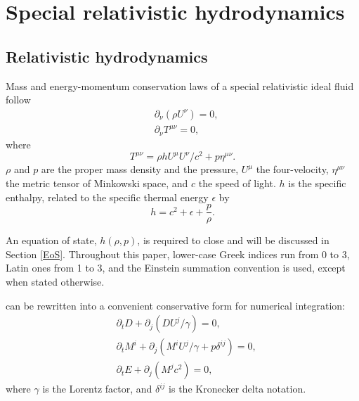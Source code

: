 \chapter{Special relativistic hydrodynamics}
\label{c:special-relativistic-hydrodynamics}
\section{Relativistic hydrodynamics}
\label{Relativistic Hydrodynamics}
Mass and energy-momentum conservation laws of a special relativistic ideal fluid follow
\begin{subequations}
\label{eq:conservation laws}
\begin{align}
&\partial_{\nu}\left(\rho U^{\nu}\right)=0, \label{eq:number conservation}\\
&\partial_{\nu}T^{\mu \nu} = 0, \label{eq:energy conservation}
\end{align}
\end{subequations}
where
\begin{equation}
T^{\mu \nu} = \rho h U^{\mu} U^{\nu}/c^2 + p \eta^{\mu \nu}.
\end{equation}
$\rho$ and $p$ are the proper mass density and the pressure, $U^\mu$ the four-velocity, $\eta^{\mu \nu}$ the metric tensor of Minkowski space, and $c$ the speed of light. $h$ is the specific enthalpy, related to the specific thermal energy $\epsilon$ by
\begin{equation}
  h=c^2+\epsilon +\frac{p}{\rho}.
  \label{eq:eos}
\end{equation}

An equation of state, $h\left(\rho, p\right)$, is required to close  and will be discussed in Section \ref{EoS}.
Throughout this paper, lower-case Greek indices run from 0 to 3, Latin ones from 1 to 3, and the Einstein summation convention is used, except when stated otherwise.

 can be rewritten into a convenient conservative form for numerical integration:
\begin{subequations}
  \label{conservative form}
  \begin{align}
   &\partial_{t} D+\partial_{j} \left(DU^{j}/\gamma\right)=0,\label{D evolution}\\
   &\partial_{t}M^{i}+\partial_{j} \left(M^{i}U^{j}/\gamma+p\delta^{ij}\right)=0,\label{M evolution}\\
   &\partial_t E+\partial_j  \left(M^{j}c^2\right)=0, \label{E evoltion}
  \end{align}
\end{subequations}
where $\gamma$ is the Lorentz factor, and $\delta^{ij}$ is the Kronecker delta notation.

